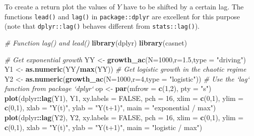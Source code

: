 \documentclass[12pt,]{book}
\newenvironment{Shaded}{\begin{snugshade}}{\end{snugshade}}
\newcommand{\CommentTok}[1]{\textcolor[rgb]{0.56,0.35,0.01}{\textit{#1}}}
\newcommand{\DataTypeTok}[1]{\textcolor[rgb]{0.13,0.29,0.53}{#1}}
\newcommand{\DecValTok}[1]{\textcolor[rgb]{0.00,0.00,0.81}{#1}}
\newcommand{\FloatTok}[1]{\textcolor[rgb]{0.00,0.00,0.81}{#1}}
\newcommand{\KeywordTok}[1]{\textcolor[rgb]{0.13,0.29,0.53}{\textbf{#1}}}
\newcommand{\NormalTok}[1]{#1}
\newcommand{\OperatorTok}[1]{\textcolor[rgb]{0.81,0.36,0.00}{\textbf{#1}}}
\newcommand{\OtherTok}[1]{\textcolor[rgb]{0.56,0.35,0.01}{#1}}
\newcommand{\StringTok}[1]{\textcolor[rgb]{0.31,0.60,0.02}{#1}}
\begin{document}
To create a return plot the values of \(Y\) have to be shifted by a certain lag. The functions \texttt{lead()} and \texttt{lag()} in \texttt{package::dplyr} are excellent for this purpose (note that \texttt{dplyr::lag()} behaves different from \texttt{stats::lag()}).

\begin{Shaded}
\begin{Highlighting}[]
\CommentTok{# Function lag() and lead()}
\KeywordTok{library}\NormalTok{(dplyr)}
\KeywordTok{library}\NormalTok{(casnet)}

\CommentTok{# Get exponential growth}
\NormalTok{YY <-}\StringTok{ }\KeywordTok{growth_ac}\NormalTok{(}\DataTypeTok{N=}\DecValTok{1000}\NormalTok{,}\DataTypeTok{r=}\FloatTok{1.5}\NormalTok{,}\DataTypeTok{type =} \StringTok{"driving"}\NormalTok{)}
\NormalTok{Y1 <-}\StringTok{ }\KeywordTok{as.numeric}\NormalTok{(YY}\OperatorTok{/}\KeywordTok{max}\NormalTok{(YY))}
\CommentTok{# Get logistic growth in the chaotic regime}
\NormalTok{Y2 <-}\StringTok{ }\KeywordTok{as.numeric}\NormalTok{(}\KeywordTok{growth_ac}\NormalTok{(}\DataTypeTok{N=}\DecValTok{1000}\NormalTok{,}\DataTypeTok{r=}\DecValTok{4}\NormalTok{,}\DataTypeTok{type =} \StringTok{"logistic"}\NormalTok{))}
\CommentTok{# Use the `lag` function from package `dplyr`}
\NormalTok{op <-}\StringTok{ }\KeywordTok{par}\NormalTok{(}\DataTypeTok{mfrow =} \KeywordTok{c}\NormalTok{(}\DecValTok{1}\NormalTok{,}\DecValTok{2}\NormalTok{), }\DataTypeTok{pty =} \StringTok{"s"}\NormalTok{)}
\KeywordTok{plot}\NormalTok{(dplyr}\OperatorTok{::}\KeywordTok{lag}\NormalTok{(Y1), Y1, }\DataTypeTok{xy.labels =} \OtherTok{FALSE}\NormalTok{, }\DataTypeTok{pch =} \DecValTok{16}\NormalTok{, }\DataTypeTok{xlim =} \KeywordTok{c}\NormalTok{(}\DecValTok{0}\NormalTok{,}\DecValTok{1}\NormalTok{), }\DataTypeTok{ylim =} \KeywordTok{c}\NormalTok{(}\DecValTok{0}\NormalTok{,}\DecValTok{1}\NormalTok{), }\DataTypeTok{xlab =} \StringTok{"Y(t)"}\NormalTok{, }\DataTypeTok{ylab =} \StringTok{"Y(t+1)"}\NormalTok{,}
     \DataTypeTok{main =} \StringTok{"exponential / max"}\NormalTok{)}
\KeywordTok{plot}\NormalTok{(dplyr}\OperatorTok{::}\KeywordTok{lag}\NormalTok{(Y2), Y2, }\DataTypeTok{xy.labels =} \OtherTok{FALSE}\NormalTok{, }\DataTypeTok{pch =} \DecValTok{16}\NormalTok{, }\DataTypeTok{xlim =} \KeywordTok{c}\NormalTok{(}\DecValTok{0}\NormalTok{,}\DecValTok{1}\NormalTok{), }\DataTypeTok{ylim =} \KeywordTok{c}\NormalTok{(}\DecValTok{0}\NormalTok{,}\DecValTok{1}\NormalTok{), }\DataTypeTok{xlab =} \StringTok{"Y(t)"}\NormalTok{, }\DataTypeTok{ylab =} \StringTok{"Y(t+1)"}\NormalTok{,}
     \DataTypeTok{main =} \StringTok{"logistic / max"}\NormalTok{)}
\end{Highlighting}
\end{Shaded}
\end{document}
